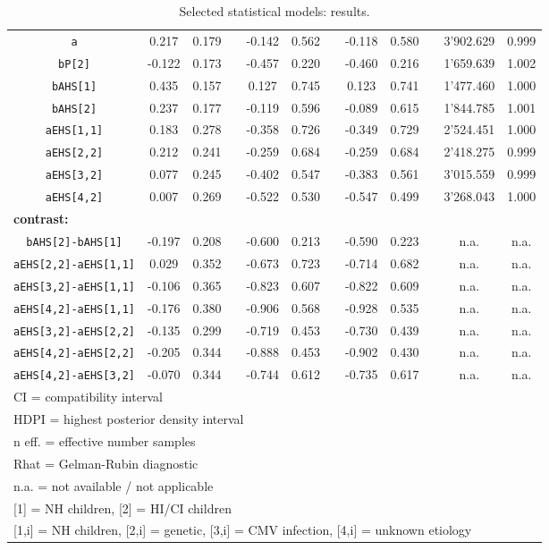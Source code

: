 \begin{table}[h!]
\begin{tabular}{|cccccccccccc|}
		\texttt{a} & 0.217 & 0.179 & & -0.142 & 0.562 & & -0.118 & 0.580 & & 3'902.629 & 0.999 \\
		\texttt{bP[2]} & -0.122 & 0.173 & & -0.457 & 0.220 & & -0.460 & 0.216 & & 1'659.639 & 1.002 \\
		\texttt{bAHS[1]} & 0.435 & 0.157 & & 0.127 & 0.745 & & 0.123 & 0.741 & & 1'477.460 & 1.000 \\
		\texttt{bAHS[2]} & 0.237 & 0.177 & & -0.119 & 0.596 & & -0.089 & 0.615 & & 1'844.785 & 1.001 \\
		\texttt{aEHS[1,1]} & 0.183 & 0.278 & & -0.358 & 0.726 & & -0.349 & 0.729 & & 2'524.451 & 1.000 \\
		\texttt{aEHS[2,2]} & 0.212 & 0.241 & & -0.259 & 0.684 & & -0.259 & 0.684 & & 2'418.275 & 0.999 \\
		\texttt{aEHS[3,2]} & 0.077 & 0.245 & & -0.402 & 0.547 & & -0.383 & 0.561 & & 3'015.559 & 0.999 \\
		\texttt{aEHS[4,2]} & 0.007 & 0.269 & & -0.522 & 0.530 & & -0.547 & 0.499 & & 3'268.043 & 1.000 \\
		\multicolumn{12}{|l|}{ \textbf{contrast:} } \\
		\texttt{bAHS[2]-bAHS[1]} & -0.197 & 0.208 & & -0.600 & 0.213 & & -0.590 & 0.223 & & n.a. & n.a. \\
		\texttt{aEHS[2,2]-aEHS[1,1]} & 0.029 & 0.352 & & -0.673 & 0.723 & & -0.714 & 0.682 & & n.a. & n.a. \\
		\texttt{aEHS[3,2]-aEHS[1,1]} & -0.106 & 0.365 & & -0.823 & 0.607 & & -0.822 & 0.609 & & n.a. & n.a. \\
		\texttt{aEHS[4,2]-aEHS[1,1]} & -0.176 & 0.380 & & -0.906 & 0.568 & & -0.928 & 0.535 & & n.a. & n.a. \\
		\texttt{aEHS[3,2]-aEHS[2,2]} & -0.135 & 0.299 & & -0.719 & 0.453 & & -0.730 & 0.439 & & n.a. & n.a. \\
		\texttt{aEHS[4,2]-aEHS[2,2]} & -0.205 & 0.344 & & -0.888 & 0.453 & & -0.902 & 0.430 & & n.a. & n.a. \\
		\texttt{aEHS[4,2]-aEHS[3,2]} & -0.070 & 0.344 & & -0.744 & 0.612 & & -0.735 & 0.617 & & n.a. & n.a. \\
		\hline
		\multicolumn{12}{l}{\footnotesize{CI = compatibility interval}} \\
		\multicolumn{12}{l}{\footnotesize{HDPI = highest posterior density interval}} \\
		\multicolumn{12}{l}{\footnotesize{n eff. = effective number samples}} \\
		\multicolumn{12}{l}{\footnotesize{Rhat = Gelman-Rubin diagnostic}} \\
		\multicolumn{12}{l}{\footnotesize{n.a. = not available / not applicable}} \\
		\multicolumn{12}{l}{\footnotesize{[1] = NH children, [2] = HI/CI children}} \\
		\multicolumn{12}{l}{\footnotesize{[1,i] = NH children, [2,i] = genetic, [3,i] = CMV infection, [4,i] = unknown etiology}} \\
	\end{tabular}
	\caption[Selected statistical models: results]{Selected statistical models: results.}
	\label{tab:results}
\end{table}

